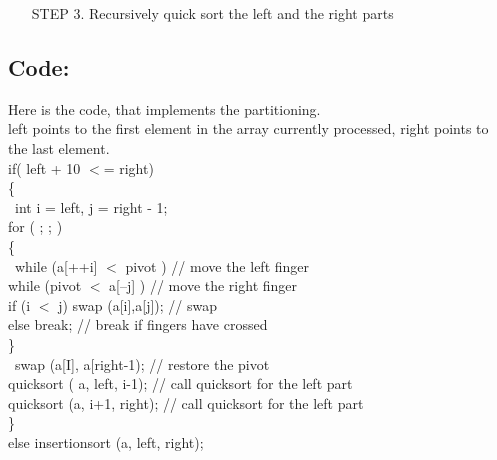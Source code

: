 \documentclass{article}
\begin{document}
\begin{enumerate}
\begin{enumerate}
			[5, 3, 25, 6, 10, 17, 1, 2, 18, 8]\\
			\^\qquad\qquad\qquad\qquad\qquad\qquad\^\\
			i \qquad\qquad\qquad\qquad\qquad\qquad j\\
			\begin{enumerate}
				\item  While i is to the left of j, we move i right, skipping all the elements 
				less than the pivot. If an element is found greater then the pivot, i stops
				\item  While j is to the right of i, we move j left, skipping all the elements 
				greater than the pivot. If an element is found less then the pivot, j stops
				\item  When both i and j have stopped, the elements are swapped.
				\item  When i and j have crossed, no swap is performed, scanning stops, 
				and the element pointed to by i is swapped with the pivot .
				In the example the first swapping will be between 25 and 2, the second between 10 and 1.
			\end{enumerate}
			3. Restore the pivot.
			After restoring the pivot we obtain the following partitioning into three groups:
			[5, 3, 2, 6, 1] [ 8 ] [10, 25, 18, 17]
			
		\end{enumerate}
		\item[STEP 3.]Recursively quick sort the left and the right parts
	\end{enumerate}
	
	
	\subsection{Code:}
	Here is the code, that implements the partitioning.\\
	left points to the first element in the array currently processed, right points to the last element. \\
	if( left + 10 $<$= right)\\
	\{\\\
	int i = left, j = right - 1;\\
	for ( ; ; )\\
	\{\\\
	while (a[++i] $<$ pivot  ) {}   // move the left finger\\
	while (pivot  $<$ a[--j] ) {}   // move the right finger\\
	if (i $<$ j) swap (a[i],a[j]);  // swap       \\
	else  break;                  // break if fingers have crossed\\
	\}\\\
	swap (a[I], a[right-1);            // restore the pivot\\
	quicksort ( a, left, i-1);         // call quicksort for the left part\\
	quicksort (a, i+1, right);         // call quicksort for the left part\\
	\}\ \\
	else  insertionsort (a, left, right);\\\\
	
\end{document}
